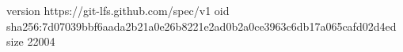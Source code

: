 version https://git-lfs.github.com/spec/v1
oid sha256:7d07039bbf6aada2b21a0e26b8221e2ad0b2a0ce3963c6db17a065cafd02d4ed
size 22004
